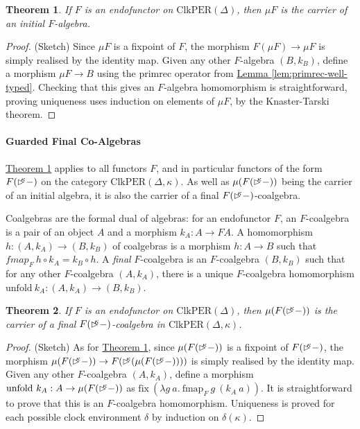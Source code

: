 \documentclass[natbib]{sigplanconf}
\newcommand{\delay}[1]{\mathord{\rhd\kern-0.4em^{#1}}}
\newcommand{\ClkPER}{\mathrm{ClkPER}}
\newtheorem{theorem}{Theorem}
\newcommand{\lemref}[1]{\hyperref[#1]{Lemma \ref*{#1}}}
\newcommand{\thmref}[1]{\hyperref[#1]{Theorem \ref*{#1}}}
\begin{document}
\begin{theorem}\label{thm:initial-f-algebra}
  If $F$ is an endofunctor on $\ClkPER(\Delta)$, then $\mu F$ is the
  carrier of an initial $F$-algebra.
\end{theorem}

\begin{proof} (Sketch) Since $\mu F$ is a fixpoint of $F$, the
  morphism $F(\mu F) \to \mu F$ is simply realised by the identity
  map. Given any other $F$-algebra $(B,k_B)$, define a morphism $\mu F
  \to B$ using the $\mathrm{primrec}$ operator from
  \lemref{lem:primrec-well-typed}. Checking that this gives an
  $F$-algebra homomorphism is straightforward, proving uniqueness uses
  induction on elements of $\mu F$, by the Knaster-Tarski theorem.
\end{proof}

\paragraph{Guarded Final Co-Algebras} \thmref{thm:initial-f-algebra}
applies to all functors $F$, and in particular functors of the form
$F(\delay\kappa-)$ on the category $\ClkPER(\Delta, \kappa)$. As well
as $\mu (F(\delay\kappa -))$ being the carrier of an initial algebra,
it is also the carrier of a final $F(\delay\kappa-)$-coalgebra.

Coalgebras are the formal dual of algebras: for an endofunctor $F$, an
$F$-coalgebra is a pair of an object $A$ and a morphism $k_A : A \to
FA$. A homomorphism $h : (A,k_A) \to (B,k_B)$ of coalgebras is a
morphism $h : A \to B$ such that $\mathit{fmap}_F~h \circ k_A =
k_B\circ h$. A \emph{final} $F$-coalgebra is an $F$-coalgebra
$(B,k_B)$ such that for any other $F$-coalgebra $(A,k_A)$, there is a
unique $F$-coalgebra homomorphism $\mathrm{unfold}~k_A : (A,k_A) \to
(B,k_B)$.

\begin{theorem}\label{thm:final-f-de-coalgebra}
  If $F$ is an endofunctor on $\ClkPER(\Delta)$, then $\mu
  (F(\delay\kappa-))$ is the carrier of a final
  $F(\delay\kappa-)$-coalgebra in $\ClkPER(\Delta,\kappa)$.
\end{theorem}

\begin{proof} (Sketch) As for \thmref{thm:initial-f-algebra}, since
  $\mu (F(\delay\kappa-))$ is a fixpoint of $F(\delay\kappa-)$, the
  morphism $\mu (F(\delay\kappa-)) \to F(\delay\kappa(\mu (F(\delay\kappa-))))$ is simply realised by the identity
  map. Given any other $F$-coalgebra $(A,k_A)$, define a morphism
  $\mathrm{unfold}~k_A : A \to \mu(F(\delay\kappa-))$ as
  $\mathrm{fix}~(\lambda g~a.~\mathrm{fmap}_F~g~(k_A~a))$. It is
  straightforward to prove that this is an $F$-coalgebra
  homomorphism. Uniqueness is proved for each possible clock
  environment $\delta$ by induction on $\delta(\kappa)$.
\end{proof}
\end{document}
